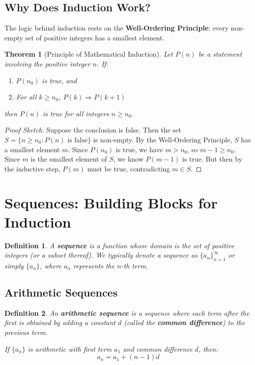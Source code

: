 \documentclass[12pt]{article}
\newtheorem{definition}{Definition}
\newtheorem{theorem}{Theorem}
\begin{document}
\subsection{Why Does Induction Work?}

The logic behind induction rests on the \textbf{Well-Ordering Principle}: every non-empty set of positive integers has a smallest element.

\begin{theorem}[Principle of Mathematical Induction]
Let $P(n)$ be a statement involving the positive integer $n$. If:
\begin{enumerate}
\item $P(n_0)$ is true, and
\item For all $k \geq n_0$, $P(k) \Rightarrow P(k+1)$
\end{enumerate}
then $P(n)$ is true for all integers $n \geq n_0$.
\end{theorem}

\begin{proof}[Proof Sketch]
Suppose the conclusion is false. Then the set $S = \{n \geq n_0 : P(n) \text{ is false}\}$ is non-empty. By the Well-Ordering Principle, $S$ has a smallest element $m$. Since $P(n_0)$ is true, we have $m > n_0$, so $m-1 \geq n_0$. Since $m$ is the smallest element of $S$, we know $P(m-1)$ is true. But then by the inductive step, $P(m)$ must be true, contradicting $m \in S$.
\end{proof}

\section{Sequences: Building Blocks for Induction}

\begin{definition}
A \textbf{sequence} is a function whose domain is the set of positive integers (or a subset thereof). We typically denote a sequence as $\{a_n\}_{n=1}^{\infty}$ or simply $\{a_n\}$, where $a_n$ represents the $n$-th term.
\end{definition}

\subsection{Arithmetic Sequences}

\begin{definition}
An \textbf{arithmetic sequence} is a sequence where each term after the first is obtained by adding a constant $d$ (called the \textbf{common difference}) to the previous term.

If $\{a_n\}$ is arithmetic with first term $a_1$ and common difference $d$, then:
$$a_n = a_1 + (n-1)d$$
\end{definition}
\end{document}
